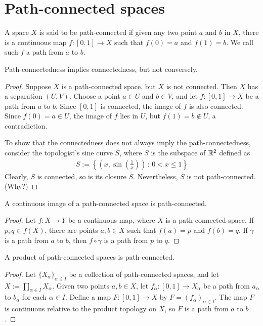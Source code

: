 \section{Path-connected spaces}

\begin{defi}
    A space $X$ is said to be path-connected if given any two point $a$ and $b$ in $X$, there is a continuous map $f: [0, 1]\rightarrow X$ such that $f(0)=a$ and $f(1)=b$.
    We call such $f$ a path from $a$ to $b$.
\end{defi}

\begin{prop}
    Path-connectedness implies connectedness, but not conversely.
\end{prop}
\begin{proof}
    Suppose $X$ is a path-connected space, but $X$ is not connected.
    Then $X$ has a separation $(U, V)$.
    Choose a point $a\in U$ and $b\in V$, and let $f: [0, 1]\rightarrow X$ be a path from $a$ to $b$.
    Since $[0, 1]$ is connected, the image of $f$ is also connected.
    Since $f(0)=a\in U$, the image of $f$ lies in $U$, but $f(1)=b\notin U$, a contradiction.

    To show that the connectedness does not always imply the path-connectedness, consider the topologist's sine curve $\overline{S}$, where $S$ is the subspace of ${\mathbb{R}}^2$ defined as
    \begin{align*}
        S:=\left\{
            \left(x, \sin\left(\frac{1}{x}\right)\right)
            \,:\,
            0<x\leq 1
            \right\}
    \end{align*}
    Clearly, $S$ is connected, so is its closure $\overline{S}$.
    Nevertheless, $\overline{S}$ is not path-connected. \color{brown}(Why?)\color{black}
\end{proof}

\begin{prop}
    A continuous image of a path-connected space is path-connected.
\end{prop}
\begin{proof}
    Let $f: X\rightarrow Y$ be a continuous map, where $X$ is a path-connected space.
    If $p, q\in f(X)$, there are points $a, b\in X$ such that $f(a)=p$ and $f(b)=q$.
    If $\gamma$ is a path from $a$ to $b$, then $f\circ\gamma$ is a path from $p$ to $q$.
\end{proof}

\begin{prop}
    A product of path-connected spaces is path-connected.
\end{prop}
\begin{proof}
    Let $\{X_\alpha\}_{\alpha\in I}$ be a collection of path-connected spaces, and let $X:=\prod_{\alpha\in I} X_\alpha$.
    Given two points $a, b\in X$, let $f_\alpha: [0, 1]\rightarrow X_\alpha$ be a path from $a_\alpha$ to $b_\alpha$ for each $\alpha\in I$.
    Define a map $F: [0, 1]\rightarrow X$ by $F=(f_\alpha)_{\alpha\in I}$.
    The map $F$ is continuous relative to the product topology on $X$, so $F$ is a path from $a$ to $b$.
\end{proof}

